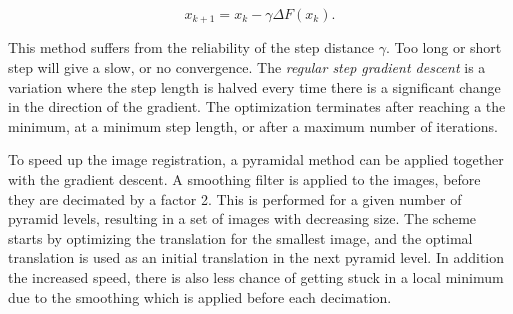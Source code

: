 \begin{equation}
\label{gradient descent}
x_{k+1} = x_k - \gamma \Delta F(x_k).
\end{equation}

This method suffers from the reliability of the step distance $\gamma$. Too long or short step will give a slow, or no convergence. The \textit{regular step gradient descent} is a variation where the step length is halved every time there is a significant change in the direction of the gradient. The optimization terminates after reaching a the minimum, at a minimum step length, or after a maximum number of iterations.

To speed up the image registration, a pyramidal method can be applied together with the gradient descent. A smoothing filter is applied to the images, before they are decimated by a factor 2. This is performed for a given number of pyramid levels, resulting in a set of images with decreasing size. The scheme starts by optimizing the translation for the smallest image, and the optimal translation is used as an initial translation in the next pyramid level. In addition the increased speed, there is also less chance of getting stuck in a local minimum due to the smoothing which is applied before each decimation.
 








